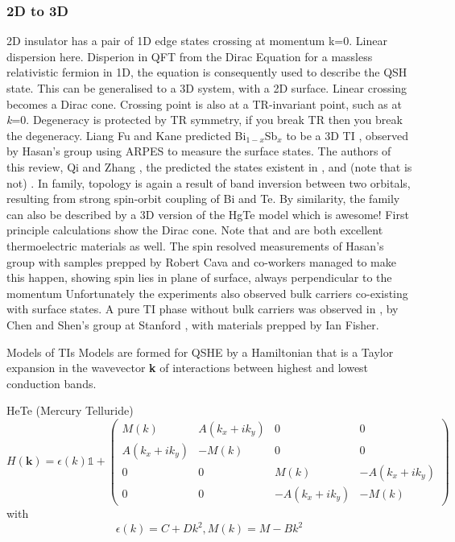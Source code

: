 \documentclass[../mattg_ti-fi_lit-review.tex]{subfiles}
\begin{document}
	\subsubsection{2D to 3D}
	\begin{outline}	
		\1 2D insulator has a pair of 1D edge states crossing at momentum k=0. Linear dispersion here. Disperion in QFT from the Dirac Equation for a massless relativistic fermion in 1D, the equation is consequently used to describe the QSH state.
		\1 This can be generalised to a 3D system, with a 2D surface. Linear crossing becomes a Dirac cone. Crossing point is also at a TR-invariant point, such as at \textit{k}=0. Degeneracy is protected by TR symmetry, if you break TR then you break the degeneracy. 
		\1 Liang Fu and Kane predicted Bi$_{1-x}$Sb$_x$ to be a 3D TI \cite{fu_topological_2007}, observed by Hasan's group \cite{hsieh_topological_2008} using ARPES to measure the surface states.
		The authors of this review, Qi and Zhang \cite{qi_quantum_2010}, the predicted the states existent in \bismuthselinide{}, \bismuthtelluride{} and \antimonytelluride{} (note that \antimonyselenide{} is not) \cite{zhang_topological_2009}.
		\2 In \bismuthtelluride{} family, topology is again a result of band inversion between two orbitals, resulting from strong spin-orbit coupling of Bi and Te. By similarity, the family can also be described by a 3D version of the HgTe model which is awesome! 
		\2 First principle calculations show the Dirac cone.
		\2 Note that \bismuthselinide{} and \bismuthtelluride{} are both excellent thermoelectric materials as well.
		\2 The spin resolved measurements of Hasan's group with samples prepped by Robert Cava and co-workers managed to make this happen, showing spin lies in plane of surface, always perpendicular to the momentum 
		\2 Unfortunately the experiments also observed bulk carriers co-existing with surface states.
		\2 A pure TI phase without bulk carriers was observed in \bismuthtelluride{}, by Chen and Shen's group at Stanford \cite{chen_experimental_2009}, with materials prepped by Ian Fisher.
		
		\1 Models of TIs
		\2 Models are formed for QSHE by a Hamiltonian that is a Taylor expansion in the wavevector \textbf{k} of interactions between highest and lowest conduction bands.
		
		\3 HeTe (Mercury Telluride)
		\begin{equation}
		H(\textbf{k}) = \epsilon(k)\mathds{1} + \left(
		\begin{matrix}
		M(k) & A(k_x+ik_y) & 0 & 0\\
		A(k_x+ik_y) & -M(k) & 0 & 0\\
		0 & 0 & M(k) & -A(k_x+ik_y)\\
		0 & 0 & -A(k_x+ik_y) & -M(k)
		\end{matrix}
		\right)
		\end{equation}
		with \begin{equation}
		\epsilon(k)=C+Dk^2, M(k) = M - Bk^2
		\end{equation}
		

\end{outline}
\end{document}
